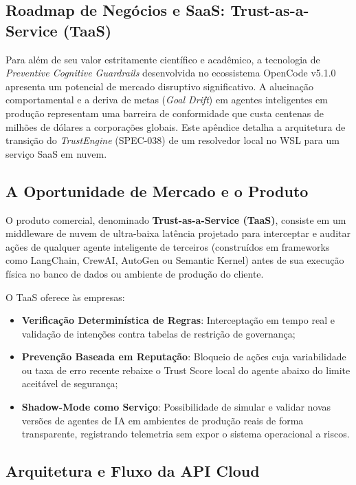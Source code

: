 \documentclass[12pt,a4paper,oneside]{abntex2}
\begin{document}
\begin{apendicesenv}
\chapter{Roadmap de Negócios e SaaS: Trust-as-a-Service (TaaS)}

Para além de seu valor estritamente científico e acadêmico, a tecnologia de \textit{Preventive Cognitive Guardrails} desenvolvida no ecossistema OpenCode v5.1.0 apresenta um potencial de mercado disruptivo significativo. A alucinação comportamental e a deriva de metas (\textit{Goal Drift}) em agentes inteligentes em produção representam uma barreira de conformidade que custa centenas de milhões de dólares a corporações globais. Este apêndice detalha a arquitetura de transição do \textit{TrustEngine} (SPEC-038) de um resolvedor local no WSL para um serviço SaaS em nuvem.

\section{A Oportunidade de Mercado e o Produto}

O produto comercial, denominado \textbf{Trust-as-a-Service (TaaS)}, consiste em um middleware de nuvem de ultra-baixa latência projetado para interceptar e auditar ações de qualquer agente inteligente de terceiros (construídos em frameworks como LangChain, CrewAI, AutoGen ou Semantic Kernel) antes de sua execução física no banco de dados ou ambiente de produção do cliente.

O TaaS oferece às empresas:
\begin{itemize}
    \item \textbf{Verificação Determinística de Regras}: Interceptação em tempo real e validação de intenções contra tabelas de restrição de governança;
    \item \textbf{Prevenção Baseada em Reputação}: Bloqueio de ações cuja variabilidade ou taxa de erro recente rebaixe o Trust Score local do agente abaixo do limite aceitável de segurança;
    \item \textbf{Shadow-Mode como Serviço}: Possibilidade de simular e validar novas versões de agentes de IA em ambientes de produção reais de forma transparente, registrando telemetria sem expor o sistema operacional a riscos.
\end{itemize}

\section{Arquitetura e Fluxo da API Cloud}


\end{apendicesenv}
\end{document}
